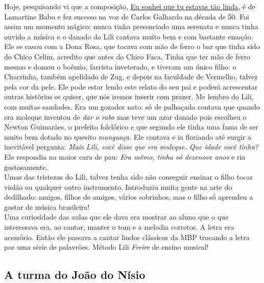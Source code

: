 \documentclass[12pt,brazil,]{book}
\begin{document}
Hoje, pesquisando vi que a composição,
\href{https://www.youtube.com/watch?v=5hHoRXzd8PI}{Eu sonhei que tu
estavas tão linda}, é de Lamartine Babo e fez sucesso na voz de Carlos
Galhardo na década de 50. Foi assim um momento mágico: nunca tinha
presenciado uma serenata e nunca tinha ouvido a música e o danado do
Lili cantava muito bem e com bastante emoção. Ele se casou com a Dona
Rosa, que tocava com mão de ferro o bar que tinha sido do Chico Celim,
acredito que antes do Chico Faca. Tinha que ter mão de ferro mesmo e
domou o boêmio, farrista inveterado, e tiveram um único filho: o
Chacrinha, também apelidado de Zug, e depois na faculdade de Vermelho,
talvez pela cor da pele. Ele pode estar lendo este relato do seu pai e
poderá acrescentar outras histórias se quiser, que nós iremos inserir
com prazer. Me lembro do Lili, com muitas saudades. Era um gozador nato:
só de palhaçada contava que quando era moleque inventou de \emph{dar o
rabo} mas teve um azar danado pois escolheu o Newton Guimarães, o
prefeito folclórico e que segundo ele tinha uma fama de ser muito bem
dotado no quesito \emph{manguaça}. Ele contava e ia floriando até surgir
a inevitável pergunta: \emph{Mais Lili, você disse que era muleque. Que
idade você tinha?} Ele respondia na maior cara de pau: \emph{Era mêmo,
tinha só dezenove anos} e ria gostosamente.\\
Umas das tristezas do Lili, talvez tenha sido não conseguir ensinar o
filho tocar violão ou qualquer outro instrumento. Introduziu muita gente
na arte do dedilhado: amigos, filhos de amigos, vários sobrinhos, mas o
filho só aprendeu a gostar de música brasileira!\\
Uma curiosidade das aulas que ele dava era mostrar ao aluno que o que
interessava era, ao cantar, manter o tom e a melodia corretos. A letra
era acessório. Então ele passava a cantar lindos clássicos da MBP
trocando a letra por uma série de palavrões. Método Lili \emph{Freire}
de ensino musical!

\subsection{A turma do João do
Nísio}\label{a-turma-do-jouxe3o-do-nuxedsio}
\end{document}
